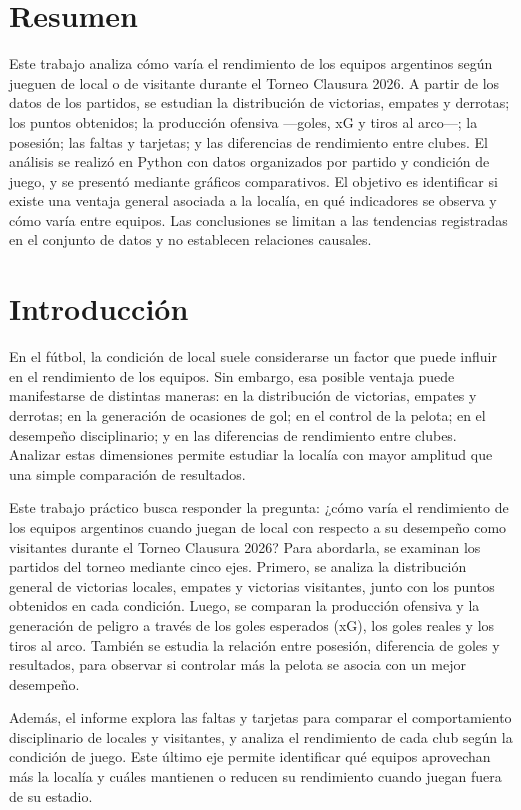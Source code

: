 \documentclass[12pt,a4paper]{article}
\begin{document}
\section{Resumen}
 Este trabajo analiza cómo varía el rendimiento de los equipos argentinos según jueguen de local o de visitante durante el Torneo Clausura 2026. A partir de los datos de los partidos, se estudian la distribución de victorias, empates y derrotas; los puntos obtenidos; la producción ofensiva —goles, xG y tiros al arco—; la posesión; las faltas y tarjetas; y las diferencias de rendimiento entre clubes. El análisis se realizó en Python con datos organizados por partido y condición de juego, y se presentó mediante gráficos comparativos. El objetivo es identificar si existe una ventaja general asociada a la localía, en qué indicadores se observa y cómo varía entre equipos. Las conclusiones se limitan a las tendencias registradas en el conjunto de datos y no establecen relaciones causales.


\section{Introducción}
En el fútbol, la condición de local suele considerarse un factor que puede influir en el rendimiento de los equipos. Sin embargo, esa posible ventaja puede manifestarse de distintas maneras: en la distribución de victorias, empates y derrotas; en la generación de ocasiones de gol; en el control de la pelota; en el desempeño disciplinario; y en las diferencias de rendimiento entre clubes. Analizar estas dimensiones permite estudiar la localía con mayor amplitud que una simple comparación de resultados.

Este trabajo práctico busca responder la pregunta: ¿cómo varía el rendimiento de los equipos argentinos cuando juegan de local con respecto a su desempeño como visitantes durante el Torneo Clausura 2026? Para abordarla, se examinan los partidos del torneo mediante cinco ejes. Primero, se analiza la distribución general de victorias locales, empates y victorias visitantes, junto con los puntos obtenidos en cada condición. Luego, se comparan la producción ofensiva y la generación de peligro a través de los goles esperados (xG), los goles reales y los tiros al arco. También se estudia la relación entre posesión, diferencia de goles y resultados, para observar si controlar más la pelota se asocia con un mejor desempeño.

Además, el informe explora las faltas y tarjetas para comparar el comportamiento disciplinario de locales y visitantes, y analiza el rendimiento de cada club según la condición de juego. Este último eje permite identificar qué equipos aprovechan más la localía y cuáles mantienen o reducen su rendimiento cuando juegan fuera de su estadio.
\end{document}

